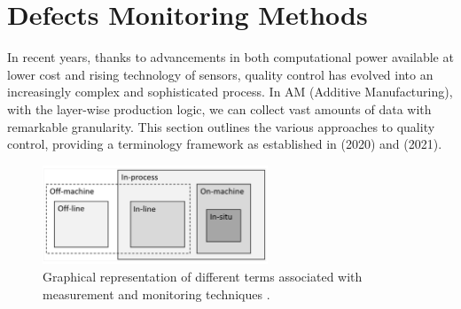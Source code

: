 \begin{itemize}
\end{itemize}


\section{Defects Monitoring Methods}
\label{sec:comelotrovo}
In recent years, thanks to advancements in both computational power available at lower cost and rising technology of sensors, quality control has evolved into an increasingly complex and sophisticated process. In AM (Additive Manufacturing), with the layer-wise production logic, we can collect vast amounts of data with remarkable granularity. This section outlines the various approaches to quality control, providing a terminology framework as established in \citeauthor{richard_leach_integrated_2020} (2020) and \citeauthor{grasso_-situ_2021} (2021).
\begin{figure}
    \centering
    \includegraphics[width=0.6\textwidth]{Images/dovevai.png}
    \caption[Measurement and monitoring techniques.]{Graphical representation of different terms associated with measurement and monitoring techniques \cite{richard_leach_integrated_2020}.}
    \label{fig:dovevai}
\end{figure}
